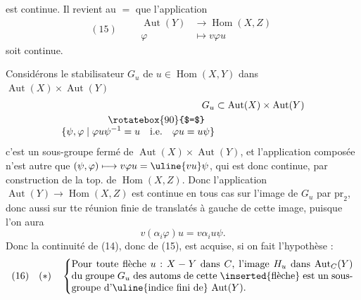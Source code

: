 est continue. Il revient au $=$ que l'application
\[
(15)\qquad\begin{aligned}
\operatorname{Aut}(Y)&\longrightarrow\operatorname{Hom}(X,Z)\\
\varphi&\longmapsto v\varphi u
\end{aligned}
\]
soit continue.

Considérons  le stabilisateur 
$G_u$ de $u\in\operatorname{Hom}(X,Y)$ dans $\operatorname{Aut}(X)\times\operatorname{Aut}(Y)$
\[
\begin{aligned}
G_u&\subset\operatorname{Aut}(X)\times\operatorname{Aut}(Y)\\
\rotatebox{90}{$=$}\quad&\\[-1ex]
\{\psi,\varphi\mid\varphi u\psi^{-1}=u\quad\text{i.e.}\quad\varphi u=u\psi\}&
\end{aligned}
\]
c'est un sous-groupe fermé de $\operatorname{Aut}(X)\times\operatorname{Aut}(Y)$,
et l'application composée
n'est autre que $(\psi,\varphi)\longmapsto v\varphi u=\uline{vu}\psi$, qui est
donc continue, par construction de la top. de
$\operatorname{Hom}(X,Z)$. Donc l'application $\operatorname{Aut}(Y)\longrightarrow\operatorname{Hom}(X,Z)$
est continue en tous cas sur l'image  de $G_u$
par $\mathrm{pr}_2$,  donc aussi sur tte réunion
finie de translatés à gauche  de cette image,
puisque l'on aura 
\[
v(\alpha_i\varphi)u=v\alpha_i u\psi.
\]
Donc la continuité de (14), donc de (15), est
acquise, si on fait l'hypothèse :
\[
(16)\quad(*)\quad\left\{
\begin{minipage}{0.83\linewidth}
Pour toute flèche $u:X\mathbin{-}Y$ dans $C$, l'image
$H_u$ dans $\operatorname{Aut}_C(Y)$ du groupe $G_u$ des automs de cette
\inserted{flèche} est un sous-groupe d'\uline{indice fini de}
$\operatorname{Aut}(Y)$.
\end{minipage}\right.
\]
